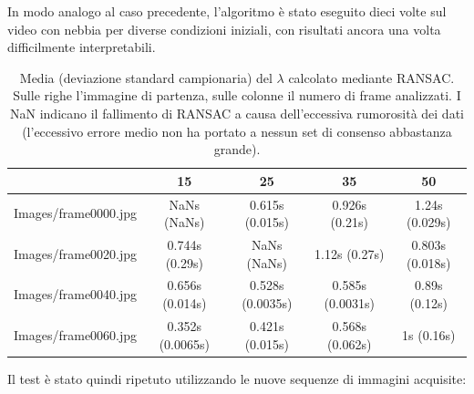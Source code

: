 \documentclass[12pt]{report}
\begin{document}
\noindent In modo analogo al caso precedente, l'algoritmo \`e stato eseguito dieci volte sul video con nebbia per diverse condizioni iniziali, con risultati ancora una volta difficilmente interpretabili.

\begin{table}[H]
\begin{center}
\begin{tabular}{|c|c|c|c|c|}
	\hline
	& 15 & 25 & 35 & 50 \\ \hline
	Images/frame0000.jpg & NaNs (NaNs) & 0.615s (0.015s) & 0.926s (0.21s) & 1.24s (0.029s)\\ \hline
	Images/frame0020.jpg & 0.744s (0.29s) & NaNs (NaNs) & 1.12s (0.27s) & 0.803s (0.018s)\\ \hline
	Images/frame0040.jpg & 0.656s (0.014s) & 0.528s (0.0035s) & 0.585s (0.0031s) & 0.89s (0.12s)\\ \hline
	Images/frame0060.jpg & 0.352s (0.0065s) & 0.421s (0.015s) & 0.568s (0.062s) & 1s (0.16s)\\ \hline
\end{tabular}
\caption{Media (deviazione standard campionaria) del $\lambda$ calcolato mediante RANSAC. Sulle righe l'immagine di partenza, sulle colonne il numero di frame analizzati. I NaN indicano il fallimento di RANSAC a causa dell'eccessiva rumorosit\`a dei dati (l'eccessivo errore medio non ha portato a nessun set di consenso abbastanza grande).}
\label{tabRans}
\end{center}
\end{table}

\noindent Il test \`e stato quindi ripetuto utilizzando le nuove sequenze di immagini acquisite:
\end{document}
